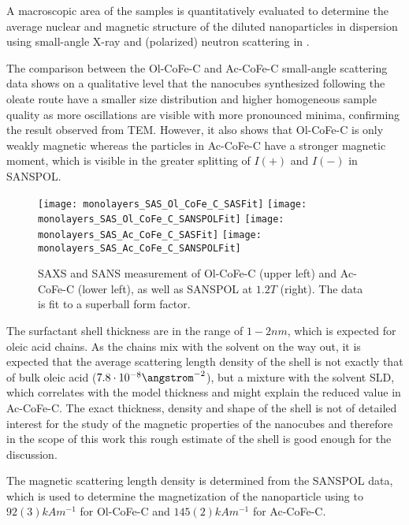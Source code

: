 \documentclass[\main/dresen_thesis.tex]{subfiles}
\begin{document}
  \label{sec:monolayers:nanoparticle:saxs}

    A macroscopic area of the samples is quantitatively evaluated to determine the average nuclear and magnetic structure of the diluted nanoparticles in dispersion using small-angle X-ray and (polarized) neutron scattering in .

    The comparison between the Ol-CoFe-C and Ac-CoFe-C small-angle scattering data shows on a qualitative level that the nanocubes synthesized following the oleate route have a smaller size distribution and higher homogeneous sample quality as more oscillations are visible with more pronounced minima, confirming the result observed from TEM.
    However, it also shows that Ol-CoFe-C is only weakly magnetic whereas the particles in Ac-CoFe-C have a stronger magnetic moment, which is visible in the greater splitting of $I(+)$ and $I(-)$ in SANSPOL.
    
    \begin{figure}[tb]
      \centering
      \texttt{[image: monolayers\_SAS\_Ol\_CoFe\_C\_SASFit]}
      \texttt{[image: monolayers\_SAS\_Ol\_CoFe\_C\_SANSPOLFit]}
      \texttt{[image: monolayers\_SAS\_Ac\_CoFe\_C\_SASFit]}
      \texttt{[image: monolayers\_SAS\_Ac\_CoFe\_C\_SANSPOLFit]}
      \caption{\label{fig:monolayers:nanoparticle:sas:AcOlCoFeC}SAXS and SANS measurement of Ol-CoFe-C (upper left) and Ac-CoFe-C (lower left), as well as SANSPOL at $1.2 \unit{T}$ (right). The data is fit to a superball form factor.}
    \end{figure}

    The surfactant shell thickness are in the range of $1 - 2 \unit{nm}$, which is expected for oleic acid chains.
    As the chains mix with the solvent on the way out, it is expected that the average scattering length density of the shell is not exactly that of bulk oleic acid ($7.8 \cdot 10^{-8} \angstrom^{-2}$), but a mixture with the solvent SLD, which correlates with the model thickness and might explain the reduced value in Ac-CoFe-C.
    The exact thickness, density and shape of the shell is not of detailed interest for the study of the magnetic properties of the nanocubes and therefore in the scope of this work this rough estimate of the shell is good enough for the discussion.

    The magnetic scattering length density is determined from the SANSPOL data, which is used to determine the magnetization of the nanoparticle using  to $92(3) \unit{kAm^{-1}}$ for Ol-CoFe-C and $145(2) \unit{kAm^{-1}}$ for Ac-CoFe-C.
\end{document}
